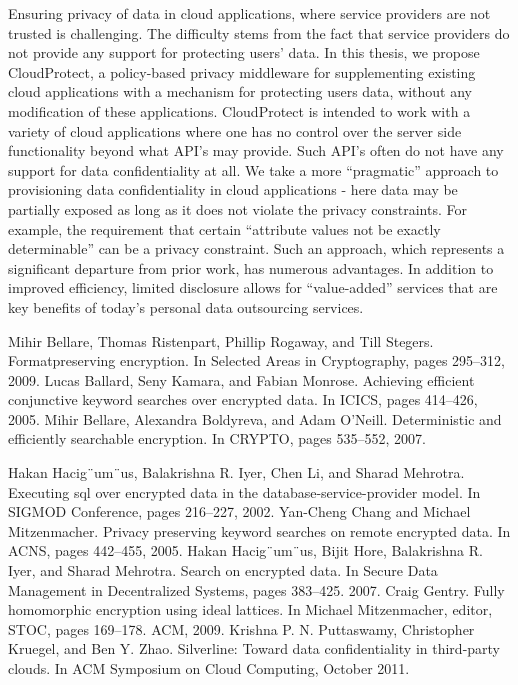 \documentclass[11pt,onecolumn]{article}
\begin{document}
Ensuring privacy of data in cloud applications, where service providers are not trusted
is challenging. The difficulty stems from the fact that service providers do not provide
any support for protecting users’ data. In this thesis, we propose CloudProtect, a
policy-based privacy middleware for supplementing existing cloud applications with
a mechanism for protecting users data, without any modification of these applications.
CloudProtect is intended to work with a variety of cloud applications where
one has no control over the server side functionality beyond what API’s may provide.
Such API’s often do not have any support for data confidentiality at all. We take
a more “pragmatic” approach to provisioning data confidentiality in cloud applications
- here data may be partially exposed as long as it does not violate the privacy
constraints. For example, the requirement that certain “attribute values not be exactly
determinable” can be a privacy constraint. Such an approach, which represents
a significant departure from prior work, has numerous advantages. In addition to improved efficiency, limited disclosure allows for “value-added” services that are key benefits of today’s personal data outsourcing services.


\begin{thebibliography}{1}
\small

 Mihir Bellare, Thomas Ristenpart, Phillip Rogaway, and Till Stegers. Formatpreserving
encryption. In Selected Areas in Cryptography, pages 295–312, 2009.
 Lucas Ballard, Seny Kamara, and Fabian Monrose. Achieving efficient conjunctive
 keyword searches over encrypted data. In ICICS, pages 414–426, 2005.
 Mihir Bellare, Alexandra Boldyreva, and Adam O’Neill. Deterministic and efficiently
searchable encryption. In CRYPTO, pages 535–552, 2007.  

Hakan Hacig¨um¨us, Balakrishna R. Iyer, Chen Li, and Sharad Mehrotra. Executing
sql over encrypted data in the database-service-provider model. In SIGMOD
Conference, pages 216–227, 2002.
 Yan-Cheng Chang and Michael Mitzenmacher. Privacy preserving keyword
searches on remote encrypted data. In ACNS, pages 442–455, 2005.
 Hakan Hacig¨um¨us, Bijit Hore, Balakrishna R. Iyer, and Sharad Mehrotra. Search
on encrypted data. In Secure Data Management in Decentralized Systems, pages
383–425. 2007.
 Craig Gentry. Fully homomorphic encryption using ideal lattices. In Michael
Mitzenmacher, editor, STOC, pages 169–178. ACM, 2009.
 Krishna P. N. Puttaswamy, Christopher Kruegel, and Ben Y. Zhao. Silverline:
Toward data confidentiality in third-party clouds. In ACM Symposium on Cloud
Computing, October 2011.

\end{thebibliography}
\end{document}

